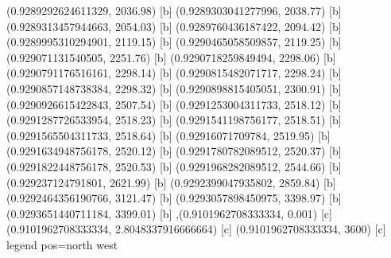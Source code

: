 {{{(0.9289292624611329, 2036.98) [b] 
(0.9289303041277996, 2038.77) [b] 
(0.9289313457944663, 2054.03) [b] 
(0.9289760436187422, 2094.42) [b] 
(0.9289995310294901, 2119.15) [b] 
(0.9290465058509857, 2119.25) [b] 
(0.929071131540505, 2251.76) [b] 
(0.9290718259849494, 2298.06) [b] 
(0.9290791176516161, 2298.14) [b] 
(0.9290815482071717, 2298.24) [b] 
(0.9290857148738384, 2298.32) [b] 
(0.9290898815405051, 2300.91) [b] 
(0.9290926615422843, 2507.54) [b] 
(0.9291253004311733, 2518.12) [b] 
(0.9291287726533954, 2518.23) [b] 
(0.9291541198756177, 2518.51) [b] 
(0.9291565504311733, 2518.64) [b] 
(0.92916071709784, 2519.95) [b] 
(0.9291634948756178, 2520.12) [b] 
(0.9291780782089512, 2520.37) [b] 
(0.9291822448756178, 2520.53) [b] 
(0.9291968282089512, 2544.66) [b] 
(0.929237124791801, 2621.99) [b] 
(0.9292399047935802, 2859.84) [b] 
(0.9292464356190766, 3121.47) [b] 
(0.9293057898450975, 3398.97) [b] 
(0.9293651440711184, 3399.01) [b] 
},{(0.9101962708333334, 0.001) [c] 
(0.9101962708333334, 2.8048337916666664) [c] 
(0.9101962708333334, 3600) [c] 
}}}{legend pos=north west}
